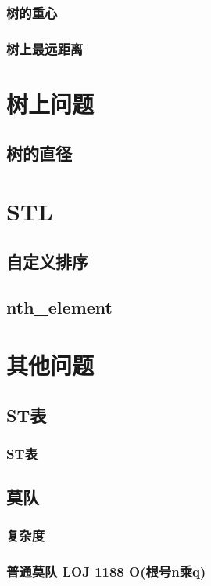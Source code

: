 \documentclass[10pt,a4paper]{article}
\begin{document}
\subsubsection{树的重心}

\subsubsection{树上最远距离}

\section{树上问题}
\subsection{树的直径}

\section{STL}
\subsection{自定义排序}

\subsection{nth\_element}

\section{其他问题}
\subsection{ST表}
\subsubsection{ST表}

\subsection{莫队}
\subsubsection{复杂度}

\subsubsection{普通莫队 LOJ 1188 O(根号n乘q)}

\end{document}
